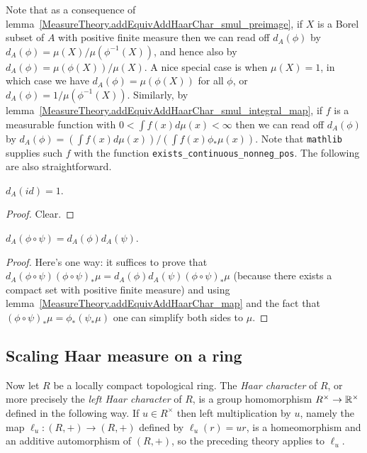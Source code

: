 Note that as a consequence of lemma~\ref{MeasureTheory.addEquivAddHaarChar_smul_preimage},
if $X$ is a Borel subset of $A$ with positive finite measure then we can read
off $d_A(\phi)$ by $d_A(\phi)=\mu(X)/\mu(\phi^{-1}(X))$, and hence also by
$d_A(\phi)=\mu(\phi(X))/\mu(X)$. A nice special case is when
$\mu(X)=1$, in which case we have $d_A(\phi)=\mu(\phi(X))$ for all $\phi$,
or $d_A(\phi)=1/\mu(\phi^{-1}(X))$.
Similarly, by lemma~\ref{MeasureTheory.addEquivAddHaarChar_smul_integral_map},
if $f$ is a measurable function with $0<\int f(x)d\mu(x)<\infty$ then
we can read off $d_A(\phi)$ by $d_A(\phi)=(\int f(x)d\mu(x))/(\int f(x)\phi_*\mu(x))$.
Note that {\tt mathlib} supplies such $f$ with the function {\tt exists\_continuous\_nonneg\_pos}.
The following are also straightforward.

\begin{lemma}
  \label{MeasureTheory.addEquivAddHaarChar_refl}
  \leanok
  $d_A(id)=1.$
\end{lemma}
\begin{proof}
  \leanok
  Clear.
\end{proof}

\begin{lemma}
  \label{MeasureTheory.addEquivAddHaarChar_trans}
  \leanok
  $d_A(\phi\circ\psi)=d_A(\phi)d_A(\psi).$
\end{lemma}
\begin{proof}
  \leanok
  Here's one way: it suffices to prove that
  $d_A(\phi\circ\psi)(\phi\circ\psi)_*\mu=d_A(\phi)d_A(\psi)(\phi\circ\psi)_*\mu$
  (because there exists a compact set with positive finite measure)
  and using lemma~\ref{MeasureTheory.addEquivAddHaarChar_map}
  and the fact that $(\phi\circ\psi)_*\mu=\phi_*(\psi_*\mu)$
  one can simplify both sides to $\mu$.
\end{proof}

\subsection{Scaling Haar measure on a ring}

Now let $R$ be a locally compact topological ring. The \emph{Haar character} of $R$,
or more precisely the \emph{left Haar character} of $R$, is a group homomorphism
$R^\times\to\mathbb{R}^\times$ defined in the following way. If $u\in R^\times$ then left multiplication
by $u$, namely the map $\ell_u:(R,+)\to(R,+)$ defined by $\ell_u(r)=ur$, is a homeomorphism and
an additive automorphism of $(R,+)$, so the preceding theory applies to $\ell_u$.

